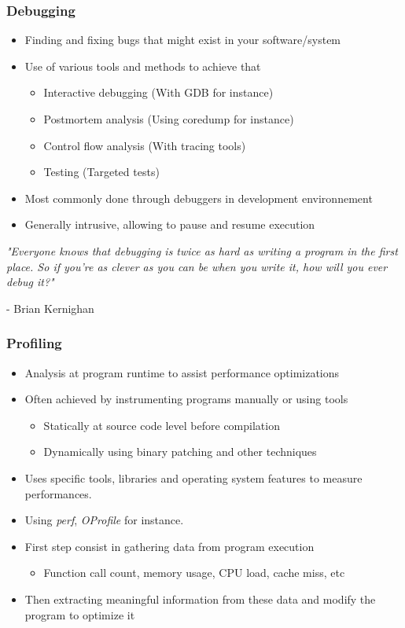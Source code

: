 \begin{frame}
  \frametitle{Debugging}
  \begin{itemize}
    \item Finding and fixing bugs that might exist in your software/system
    \item Use of various tools and methods to achieve that
    \begin{itemize}
      \item Interactive debugging (With GDB for instance)
      \item Postmortem analysis (Using coredump for instance)
      \item Control flow analysis (With tracing tools)
      \item Testing (Targeted tests)
    \end{itemize}
    \item Most commonly done through debuggers in development environnement
    \item Generally intrusive, allowing to pause and resume execution
  \end{itemize}
  \vspace{0.5cm}

  {\small \em "Everyone knows that debugging is twice as hard as writing a program in the first place. So if you're as
    clever as you can be when you write it, how will you ever debug it?" 

  - Brian Kernighan }

\end{frame}

\begin{frame}
  \frametitle{Profiling}
  \begin{itemize}
    \item Analysis at program runtime to assist performance optimizations
    \item Often achieved by instrumenting programs manually or using tools
    \begin{itemize}
      \item Statically at source code level before compilation
      \item Dynamically using binary patching and other techniques
    \end{itemize}
    \item Uses specific tools, libraries and operating system features to
          measure performances.
      \item Using {\em perf}, {\em OProfile} for instance.
    \item First step consist in gathering data from program execution
    \begin{itemize}
      \item Function call count, memory usage, CPU load, cache miss, etc
    \end{itemize}
    \item Then extracting meaningful information from these data and modify the
          program to optimize it
\end{itemize}
\end{frame}


